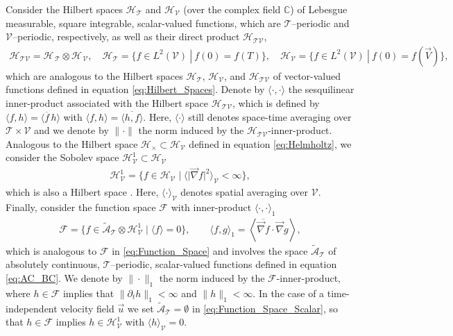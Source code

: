 \documentclass[11pt]{amsart}
\newcommand{\Tc}{\mathcal{T}}
\newcommand{\Vc}{\mathcal{V}}
\newcommand{\Hc}{\mathcal{H}}
\newcommand{\Fc}{\mathcal{F}}
\newcommand{\Hs}{\mathscr{H}}
\newcommand{\As}{\mathscr{A}}
\newcommand{\Fs}{\mathscr{F}}
\begin{document}
Consider the Hilbert
spaces $\Hc_{\Tc}$ and $\Hc_{\Vc}$
(over the complex field $\mathbb{C}$) of Lebesgue measurable, square
integrable,
scalar-valued functions,
which are $\Tc$--periodic and $\Vc$--periodic, respectively, as well
as their direct product $\Hc_{\Tc\Vc}$,  
%
\begin{align}\label{eq:Hilbert_Spaces_scalar}
  \Hc_{\Tc\Vc}=\Hc_{\,\Tc}\otimes\Hc_{\,\Vc}, \quad
  \Hc_{\Tc}=\{f\in L^2(\Vc) \ | \ f(0)=f(T)\}, \quad
  \Hc_{\Vc}=\{f\in L^2(\Vc) \ | \ f(0)=f(\vec{V})\},
\end{align}
%
which are analogous to the Hilbert spaces $\Hs_{\Tc}$, $\Hs_{\Vc}$,
and $\Hs_{\Tc\Vc}$ of vector-valued functions defined in equation
\eqref{eq:Hilbert_Spaces}. Denote by $\langle\cdot,\cdot\rangle$ the sesquilinear
inner-product associated with the Hilbert space $\Hc_{\Tc\Vc}$, which
is defined by $\langle f,h\rangle=\langle\overline{f}\, h\rangle$ with
$\langle f,h\rangle=\overline{\langle h,f\rangle}$. Here, $\langle\cdot\rangle$ still denotes space-time
averaging over $\Tc\times\Vc$ and we denote by $\|\cdot\|$ the norm induced by
the $\Hc_{\Tc\Vc}$-inner-product. Analogous to the Hilbert space
$\Hs_\times\subset\Hs_{\Vc}$ defined in equation \eqref{eq:Helmholtz}, we
consider the Sobolev space $\Hc^1_{\Vc}\subset\Hc_{\Vc}$     
% 
\begin{align}\label{eq:Sobolev}
  \Hc^1_{\Vc}=\{f\in \Hc_{\Vc} \; | \; \langle|\vec{\nabla}f|^2\rangle_{\Vc}<\infty\}, 
\end{align}
%
which is also a Hilbert space \cite{Folland:95}. Here, $\langle\cdot\rangle_{\Vc}$
denotes spatial averaging over $\Vc$. Finally, consider the 
function space $\Fc$ with inner-product $\langle\cdot,\cdot\rangle_1$
%
\begin{align}\label{eq:Function_Space_Scalar}
  \Fc=\{f\in\tilde{\As}_{\Tc}\otimes\Hc^1_{\Vc} \; | \; \langle f\rangle=0\},  \qquad
  \langle f,g\rangle_1=\left\langle\overline{\vec{\nabla}f}\cdot\vec{\nabla}g\right\rangle,
\end{align}
%
which is analogous to $\Fs$ in \eqref{eq:Function_Space} and involves
the space $\tilde{\As}_{\Tc}$ of absolutely continuous,
$\Tc$--periodic, scalar-valued functions defined in equation \eqref{eq:AC_BC}.    
We denote by $\|\cdot\|_1$ the norm induced by the $\Fc$-inner-product,
where $h\in\Fc$ implies that $\|\partial_th\|_1<\infty$ and $\|h\|_1<\infty$. In the
case of a time-independent velocity field $\vec{u}$ we set
$\tilde{\As}_{\Tc}=\emptyset$ in \eqref{eq:Function_Space_Scalar}, so that
$h\in\Fc$ implies $h\in\Hc^1_{\Vc}$ with $\langle h\rangle_{\Vc}=0$.
\end{document}
